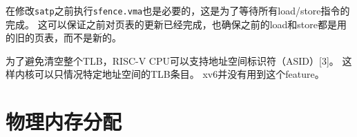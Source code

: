 在修改\texttt{satp}之前执行\texttt{sfence.vma}也是必要的，这是为了等待所有load/store指令的完成。
这可以保证之前对页表的更新已经完成，也确保之前的load和store都是用的旧的页表，而不是新的。

为了避免清空整个TLB，RISC-V CPU可以支持地址空间标识符（ASID）[3]。
这样内核可以只情况特定地址空间的TLB条目。
xv6并没有用到这个feature。

\section{物理内存分配}


